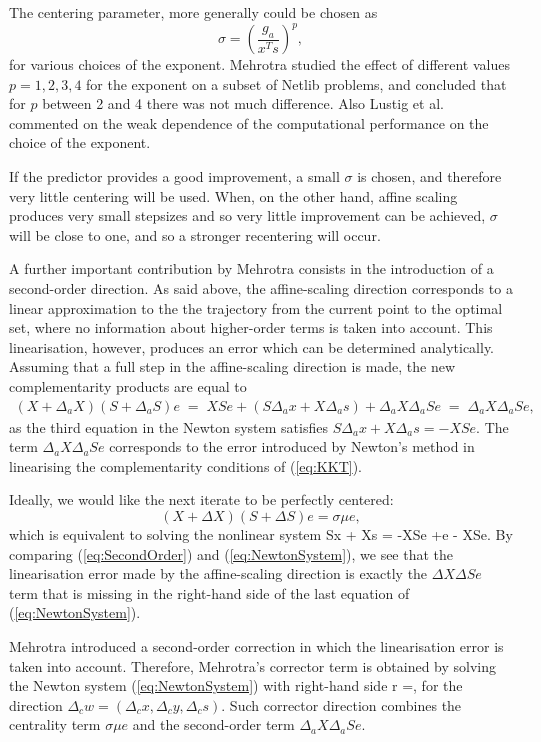 The centering parameter, more generally could be chosen as
\[
  \sigma = \left( \frac{g_a}{x^Ts} \right)^p\!\!,
\]
for various choices of the exponent. Mehrotra \cite{Mehrotra92}
studied the effect of different values $p=1,2,3,4$ for the exponent
on a subset of Netlib problems, and concluded that for $p$ between
2 and 4 there was not much difference.
Also Lustig et al. \cite{LustigMarstenShanno} commented on the
weak dependence of the computational performance on the choice 
of the exponent.

If the predictor provides a good improvement, a small $\sigma$ 
is chosen, and therefore very little centering will be used. When, 
on the other hand, affine scaling produces very small stepsizes 
and so very little improvement can be achieved, $\sigma$ will be 
close to one, and so a stronger recentering will occur.

A further important contribution by Mehrotra consists in the 
introduction of a second-order direction. 
As said above, the affine-scaling direction 
corresponds to a linear approximation to the the trajectory from 
the current point to the optimal set, where no information about 
higher-order terms is taken into account. This linearisation, 
however, produces an error which can be determined analytically.
%
Assuming that a full step in the affine-scaling direction is made, 
the new complementarity products are equal to
%
\begin{eqnarray*}
  (X + \Delta_a X) (S + \Delta_a S) e 
   \;=\; XSe + (S \Delta_a x + X \Delta_a s) + \Delta_a X \Delta_a S e
   \;=\; \Delta_a X \Delta_a S e,
\end{eqnarray*}
%
as the third equation in the Newton system satisfies 
$S \Delta_a x + X \Delta_a s = -XSe.$
%
The term $\Delta_a X \Delta_a S e$ corresponds to the error introduced
by Newton's method in linearising the complementarity conditions of 
(\ref{eq:KKT}).

Ideally, we would like the next iterate to be perfectly centered: 
\[
  (X+\Delta X)(S+\Delta S)e = \sigma\mu e,
\]
which is equivalent to solving the nonlinear system
\be  \label{eq:SecondOrder}
  S\Delta x + X\Delta s = -XSe +\sigma\mu e - \Delta X\Delta Se.
\ee
By comparing (\ref{eq:SecondOrder}) and (\ref{eq:NewtonSystem}),
we see that 
the linearisation error made by the affine-scaling direction is exactly 
the $\Delta X\Delta Se$ term that is missing in the right-hand side
of the last equation of (\ref{eq:NewtonSystem}).

Mehrotra introduced a second-order correction in which the 
linearisation error is taken into account. Therefore, 
Mehrotra's corrector term is obtained by solving the Newton system 
(\ref{eq:NewtonSystem}) with right-hand side
\be \label{eq:MehrotraRhs}
r =,
\ee
for the direction $\Delta_c w = (\Delta_c x,\Delta_c y,\Delta_c s)$.
Such corrector direction combines the centrality term $\sigma \mu e$
and the second-order term $\Delta_a X\Delta_a Se$.

